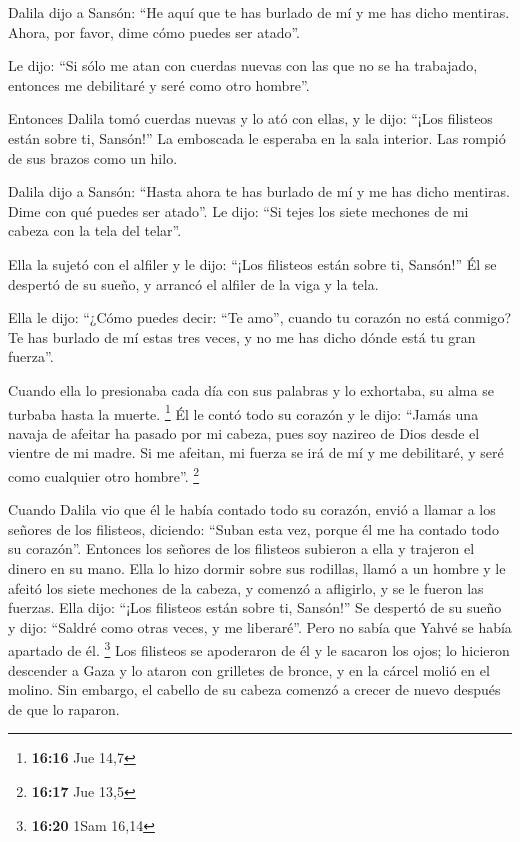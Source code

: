  Dalila dijo a Sansón: ``He aquí que te has burlado de mí
y me has dicho mentiras. Ahora, por favor, dime cómo puedes ser atado''.

 Le dijo: ``Si sólo me atan con cuerdas nuevas con las
que no se ha trabajado, entonces me debilitaré y seré como otro
hombre''.

 Entonces Dalila tomó cuerdas nuevas y lo ató con ellas,
y le dijo: ``¡Los filisteos están sobre ti, Sansón!'' La emboscada le
esperaba en la sala interior. Las rompió de sus brazos como un hilo.

 Dalila dijo a Sansón: ``Hasta ahora te has burlado de mí
y me has dicho mentiras. Dime con qué puedes ser atado''. Le dijo: ``Si
tejes los siete mechones de mi cabeza con la tela del telar''.

 Ella la sujetó con el alfiler y le dijo: ``¡Los
filisteos están sobre ti, Sansón!'' Él se despertó de su sueño, y
arrancó el alfiler de la viga y la tela.

 Ella le dijo: ``¿Cómo puedes decir: ``Te amo'', cuando
tu corazón no está conmigo? Te has burlado de mí estas tres veces, y no
me has dicho dónde está tu gran fuerza''.

 Cuando ella lo presionaba cada día con sus palabras y lo
exhortaba, su alma se turbaba hasta la muerte. \footnote{\textbf{16:16}
  Jue 14,7}  Él le contó todo su corazón y le dijo:
``Jamás una navaja de afeitar ha pasado por mi cabeza, pues soy nazireo
de Dios desde el vientre de mi madre. Si me afeitan, mi fuerza se irá de
mí y me debilitaré, y seré como cualquier otro hombre''. \footnote{\textbf{16:17}
  Jue 13,5}

 Cuando Dalila vio que él le había contado todo su
corazón, envió a llamar a los señores de los filisteos, diciendo:
``Suban esta vez, porque él me ha contado todo su corazón''. Entonces
los señores de los filisteos subieron a ella y trajeron el dinero en su
mano.  Ella lo hizo dormir sobre sus rodillas, llamó a un
hombre y le afeitó los siete mechones de la cabeza, y comenzó a
afligirlo, y se le fueron las fuerzas.  Ella dijo: ``¡Los
filisteos están sobre ti, Sansón!'' Se despertó de su sueño y dijo:
``Saldré como otras veces, y me liberaré''. Pero no sabía que Yahvé se
había apartado de él. \footnote{\textbf{16:20} 1Sam 16,14}
 Los filisteos se apoderaron de él y le sacaron los ojos;
lo hicieron descender a Gaza y lo ataron con grilletes de bronce, y en
la cárcel molió en el molino.  Sin embargo, el cabello de
su cabeza comenzó a crecer de nuevo después de que lo raparon.


